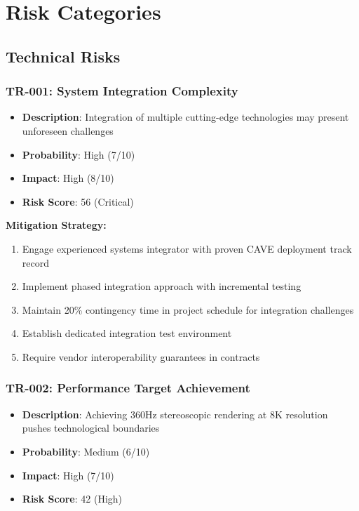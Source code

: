\section{Risk Categories}

\subsection{Technical Risks}

\subsubsection{TR-001: System Integration Complexity}
\begin{itemize}
\item \textbf{Description}: Integration of multiple cutting-edge technologies may present unforeseen challenges
\item \textbf{Probability}: High (7/10)
\item \textbf{Impact}: High (8/10)
\item \textbf{Risk Score}: 56 (Critical)
\end{itemize}

\textbf{Mitigation Strategy:}
\begin{enumerate}
\item Engage experienced systems integrator with proven CAVE deployment track record
\item Implement phased integration approach with incremental testing
\item Maintain 20\% contingency time in project schedule for integration challenges
\item Establish dedicated integration test environment
\item Require vendor interoperability guarantees in contracts
\end{enumerate}

\subsubsection{TR-002: Performance Target Achievement}
\begin{itemize}
\item \textbf{Description}: Achieving 360Hz stereoscopic rendering at 8K resolution pushes technological boundaries
\item \textbf{Probability}: Medium (6/10)
\item \textbf{Impact}: High (7/10)
\item \textbf{Risk Score}: 42 (High)
\end{itemize}

